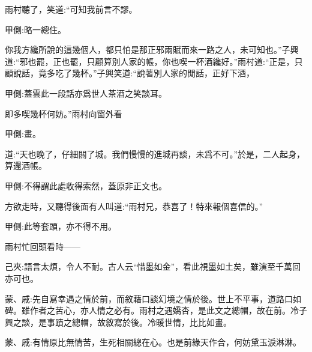 \begin{parag}
    雨村聽了，笑道:“可知我前言不謬。\begin{note}甲側:略一總住。\end{note}你我方纔所說的這幾個人，都只怕是那正邪兩賦而來一路之人，未可知也。”子興道:“邪也罷，正也罷，只顧算別人家的帳，你也喫一杯酒纔好。”雨村道:“正是，只顧說話，竟多吃了幾杯。”子興笑道:“說著別人家的閒話，正好下酒，\begin{note}甲側:蓋雲此一段話亦爲世人茶酒之笑談耳。\end{note}即多喫幾杯何妨。”雨村向窗外看\begin{note}甲側:畫。\end{note}道:“天也晚了，仔細關了城。我們慢慢的進城再談，未爲不可。”於是，二人起身，算還酒帳。\begin{note}甲側:不得謂此處收得索然，蓋原非正文也。\end{note}
\end{parag}


\begin{parag}
    方欲走時，又聽得後面有人叫道:“雨村兄，恭喜了！特來報個喜信的。”
\end{parag}


\begin{parag}
    \begin{note}甲側:此等套頭，亦不得不用。\end{note}雨村忙回頭看時——\begin{note}己夾:語言太煩，令人不耐。古人云“惜墨如金”，看此視墨如土矣，雖演至千萬回亦可也。\end{note}
\end{parag}


\begin{parag}
    \begin{note}蒙、戚:先自寫幸遇之情於前，而敘藉口談幻境之情於後。世上不平事，道路口如碑。雖作者之苦心，亦人情之必有。雨村之遇嬌杏，是此文之總帽，故在前。冷子興之談，是事蹟之總帽，故敘寫於後。冷暖世情，比比如畫。\end{note}
\end{parag}


\begin{parag}
    \begin{note}蒙、戚:有情原比無情苦，生死相關總在心。也是前緣天作合，何妨黛玉淚淋淋。\end{note}
\end{parag}


